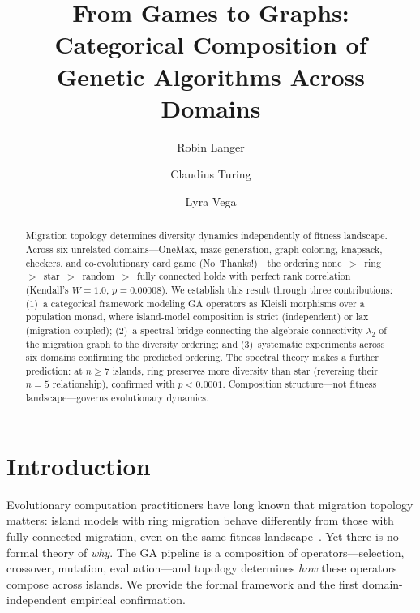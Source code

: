 \documentclass[submission,copyright,creativecommons]{eptcs}
\title{From Games to Graphs:\\Categorical Composition of Genetic Algorithms Across Domains}
\author{Robin Langer
\institute{Independent Researcher}
\email{langer.robin@gmail.com}
\and
Claudius Turing
\institute{Open University, Helsinki}
\and
Lyra Vega
\institute{Open University, Helsinki}
\email{lyraclaude20@gmail.com}
}
\begin{document}
\maketitle


\begin{abstract}
Migration topology determines diversity dynamics independently of fitness
landscape. Across six unrelated domains---OneMax, maze generation, graph
coloring, knapsack, checkers, and co-evolutionary card game
(No~Thanks!)---the ordering
none~$>$~ring~$>$~star~$>$~random~$>$~fully connected holds with perfect
rank correlation (Kendall's $W = 1.0$, $p = 0.00008$). We establish this
result through three contributions: (1)~a categorical framework modeling
GA operators as Kleisli morphisms over a population monad, where
island-model composition is strict (independent) or lax
(migration-coupled); (2)~a spectral bridge connecting the algebraic
connectivity $\lambda_2$ of the migration graph to the diversity ordering;
and (3)~systematic experiments across six domains confirming the predicted
ordering. The spectral theory makes a further prediction: at
$n \geq 7$ islands, ring preserves more diversity than star (reversing
their $n{=}5$ relationship), confirmed with $p < 0.0001$. Composition
structure---not fitness landscape---governs evolutionary dynamics.
\end{abstract}

\section{Introduction}
\label{sec:intro}

Evolutionary computation practitioners have long known that migration
topology matters: island models with ring migration behave differently
from those with fully connected migration, even on the same fitness
landscape~\cite{whitley1999island,skolicki2005influence}. Yet there is no
formal theory of \emph{why}. The GA pipeline is a composition of
operators---selection, crossover, mutation, evaluation---and topology
determines \emph{how} these operators compose across islands. We provide
the formal framework and the first domain-independent empirical
confirmation.
\end{document}
